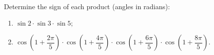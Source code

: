 Determine the sign of each product (angles in radians):
\begin{enumerate}
\item[(a)] $\sin2\cdot\sin3\cdot\sin5$;
\item[(b)] $\cos\left(1+\dfrac{2\pi}{5}\right)\cdot\cos\left(1+\dfrac{4\pi}{5}\right)\cdot\cos\left(1+\dfrac{6\pi}{5}\right)\cdot\cos\left(1+\dfrac{8\pi}{5}\right)$.
\end{enumerate}
